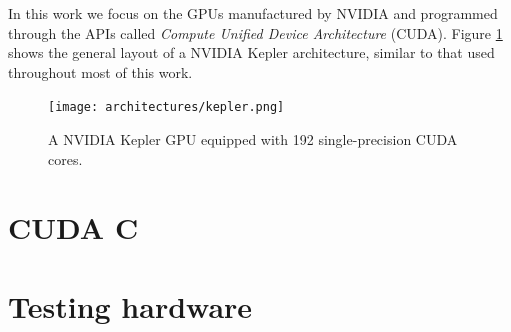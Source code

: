 In this work we focus on the GPUs manufactured by NVIDIA and programmed through the APIs called \textit{Compute Unified Device Architecture} (CUDA).
Figure \ref{kepler} shows the general layout of a NVIDIA Kepler architecture, similar to that used throughout most of this work.

\begin{figure}
\centerline{\texttt{[image: architectures/kepler.png]}}
\caption{A NVIDIA Kepler GPU equipped with 192 single-precision CUDA cores.}
\label{kepler}
\end{figure}

\section{CUDA C}

\section{Testing hardware}\label{sec:benchmark}